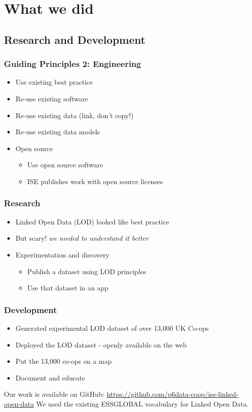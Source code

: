 \section{What we did}
\subsection{Research and Development}
\startslide
\frame
{
  \frametitle{Guiding Principles 2: Engineering}
  \begin{itemize}
    \item<1-> Use existing best practice
    \item<1-> Re-use existing software
    \item<1-> Re-use existing data (link, don't copy!)
    \item<1-> Re-use existing data models
    \item<2-> Open source
      \begin{itemize}
	\item Use open source software
	\item ISE publishes work with open source licenses
      \end{itemize}
  \end{itemize}
}
\slideend
\startslide
\frame
{
  \frametitle{Research}
  \begin{itemize}
    \item<1-> Linked Open Data (LOD) looked like best practice
    \item<1-> But scary! {\em we needed to understand it better}
    \item<2-> Experimentation and discovery
      \begin{itemize}
	\item Publish a dataset using LOD principles
	\item Use that dataset in an app
      \end{itemize}
  \end{itemize}
}
\slideend
\startslide
\frame
{
  \frametitle{Development}
  \begin{itemize}
    \item Generated experimental LOD dataset of over 13,000 UK Co-ops
    \item Deployed the LOD dataset - openly available on the web
    \item Put the 13,000 co-ops on a map
    \item Document and educate
  \end{itemize}
}
\slideend
Our work is available on GitHub: \url{https://github.com/p6data-coop/ise-linked-open-data}
We used the existing ESSGLOBAL vocabulary for Linked Open Data.

